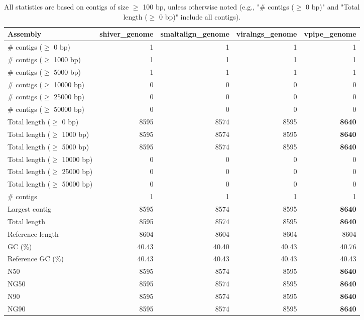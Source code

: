 \documentclass[12pt,a4paper]{article}
\begin{document}
\begin{table}[ht]
\begin{center}
\caption{All statistics are based on contigs of size $\geq$ 100 bp, unless otherwise noted (e.g., "\# contigs ($\geq$ 0 bp)" and "Total length ($\geq$ 0 bp)" include all contigs).}
\begin{tabular}{|l*{4}{|r}|}
\hline
Assembly & shiver\_genome & smaltalign\_genome & viralngs\_genome & vpipe\_genome \\ \hline
\# contigs ($\geq$ 0 bp) & 1 & 1 & 1 & 1 \\ \hline
\# contigs ($\geq$ 1000 bp) & 1 & 1 & 1 & 1 \\ \hline
\# contigs ($\geq$ 5000 bp) & 1 & 1 & 1 & 1 \\ \hline
\# contigs ($\geq$ 10000 bp) & 0 & 0 & 0 & 0 \\ \hline
\# contigs ($\geq$ 25000 bp) & 0 & 0 & 0 & 0 \\ \hline
\# contigs ($\geq$ 50000 bp) & 0 & 0 & 0 & 0 \\ \hline
Total length ($\geq$ 0 bp) & 8595 & 8574 & 8595 & {\bf 8640} \\ \hline
Total length ($\geq$ 1000 bp) & 8595 & 8574 & 8595 & {\bf 8640} \\ \hline
Total length ($\geq$ 5000 bp) & 8595 & 8574 & 8595 & {\bf 8640} \\ \hline
Total length ($\geq$ 10000 bp) & 0 & 0 & 0 & 0 \\ \hline
Total length ($\geq$ 25000 bp) & 0 & 0 & 0 & 0 \\ \hline
Total length ($\geq$ 50000 bp) & 0 & 0 & 0 & 0 \\ \hline
\# contigs & 1 & 1 & 1 & 1 \\ \hline
Largest contig & 8595 & 8574 & 8595 & {\bf 8640} \\ \hline
Total length & 8595 & 8574 & 8595 & {\bf 8640} \\ \hline
Reference length & 8604 & 8604 & 8604 & 8604 \\ \hline
GC (\%) & 40.43 & 40.40 & 40.43 & 40.76 \\ \hline
Reference GC (\%) & 40.43 & 40.43 & 40.43 & 40.43 \\ \hline
N50 & 8595 & 8574 & 8595 & {\bf 8640} \\ \hline
NG50 & 8595 & 8574 & 8595 & {\bf 8640} \\ \hline
N90 & 8595 & 8574 & 8595 & {\bf 8640} \\ \hline
NG90 & 8595 & 8574 & 8595 & {\bf 8640} \\ \hline

\end{tabular}
\end{center}
\end{table}
\end{document}
